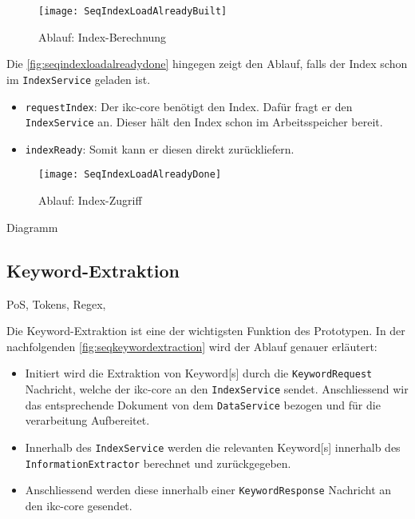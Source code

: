     \begin{figure}[H]
    \centering
    \texttt{[image: SeqIndexLoadAlreadyBuilt]}
    \caption{Ablauf: Index-Berechnung}
    \label{fig:seqindexalreadybuilt}
    \end{figure}
    
    
Die \autoref{fig:seqindexloadalreadydone} hingegen zeigt den Ablauf, falls der Index schon im \texttt{IndexService} geladen ist.

\begin{itemize}
    \item \texttt{requestIndex}: Der \gls{ikc-core} benötigt den Index. Dafür fragt er den \texttt{IndexService} an. Dieser hält den Index schon im Arbeitsspeicher bereit.
    \item \texttt{indexReady}: Somit kann er diesen direkt zurückliefern.
\end{itemize}
    
    \begin{figure}[H]
    \centering
    \texttt{[image: SeqIndexLoadAlreadyDone]}
    \caption{Ablauf: Index-Zugriff}
    \label{fig:seqindexloadalreadydone}
    \end{figure}


Diagramm

\subsection{Keyword-Extraktion}

PoS, Tokens, Regex, 

Die \gls{Keyword}-Extraktion ist eine der wichtigsten Funktion des Prototypen. In der nachfolgenden \autoref{fig:seqkeywordextraction} wird der Ablauf genauer erläutert:
\begin{itemize}
    \item Initiert wird die Extraktion von \gls{Keyword}[s] durch die \texttt{KeywordRequest} Nachricht, welche der \gls{ikc-core} an den \texttt{IndexService} sendet. Anschliessend wir das entsprechende Dokument von dem \texttt{DataService} bezogen und für die verarbeitung Aufbereitet. 
    \item Innerhalb des \texttt{IndexService} werden die relevanten \gls{Keyword}[s] innerhalb des \texttt{InformationExtractor} berechnet und zurückgegeben. 
    \item Anschliessend werden diese innerhalb einer \texttt{KeywordResponse} Nachricht an den \gls{ikc-core} gesendet.
\end{itemize}

